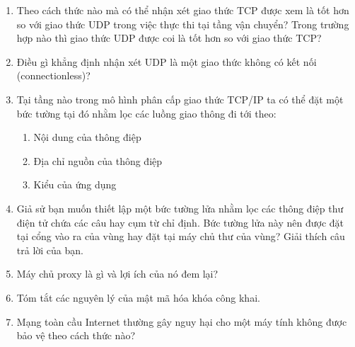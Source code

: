 \begin{multicols}{2}
\begin{enumerate}
  \item Theo cách thức nào mà có thể nhận xét giao thức TCP được xem là tốt hơn so với
    giao thức UDP trong việc thực thi tại tầng vận chuyển? Trong trường hợp nào thì giao
    thức UDP được coi là tốt hơn so với giao thức TCP?

  \item Điều gì khẳng định nhận xét UDP là một giao thức không có kết nối
    (connectionless)?

  \item Tại tầng nào trong mô hình phân cấp giao thức TCP/IP ta có thể đặt một bức tường
    tại đó nhằm lọc các luồng giao thông đi tới theo:
    \begin{enumerate}
    \item Nội dung của thông điệp

    \item Địa chỉ nguồn của thông điệp

    \item Kiểu của ứng dụng
    \end{enumerate}

  \item Giả sử bạn muốn thiết lập một bức tường lửa nhằm lọc các thông điệp thư điện tử
    chứa các câu hay cụm từ chỉ định. Bức tường lửa này nên được đặt tại cổng vào ra của
    vùng hay đặt tại máy chủ thư của vùng? Giải thích câu trả lời của bạn.

  \item Máy chủ proxy là gì và lợi ích của nó đem lại?

  \item Tóm tắt các nguyên lý của mật mã hóa khóa công khai.

  \item Mạng toàn cầu Internet thường gây nguy hại cho một máy tính không được bảo vệ theo
    cách thức nào?

  \end{enumerate}
\end{multicols}

